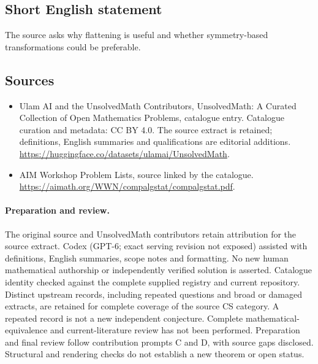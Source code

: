 \documentclass[11pt]{article}
\begin{document}
\subsection{Short English statement}
The source asks why flattening is useful and whether symmetry-based transformations could be preferable.
\subsection{Sources}
\begin{itemize}
\item[\hypertarget{source:statement:1}{S1}] Ulam AI and the UnsolvedMath Contributors, UnsolvedMath: A Curated Collection of Open Mathematics Problems, catalogue entry. Catalogue curation and metadata: CC BY 4.0. The source extract is retained; definitions, English summaries and qualifications are editorial additions.
\url{https://huggingface.co/datasets/ulamai/UnsolvedMath}.
\item[\hypertarget{source:statement:2}{S2}] AIM Workshop Problem Lists, source linked by the catalogue.
\url{https://aimath.org/WWN/compalgstat/compalgstat.pdf}.
\end{itemize}
\paragraph{Preparation and review.}
The original source and UnsolvedMath contributors retain attribution for the source extract. Codex (GPT-6; exact serving revision not exposed) assisted with definitions, English summaries, scope notes and formatting. No new human mathematical authorship or independently verified solution is asserted. Catalogue identity checked against the complete supplied registry and current repository. Distinct upstream records, including repeated questions and broad or damaged extracts, are retained for complete coverage of the source CS category. A repeated record is not a new independent conjecture. Complete mathematical-equivalence and current-literature review has not been performed. Preparation and final review follow contribution prompts C and D, with source gaps disclosed. Structural and rendering checks do not establish a new theorem or open status.
\label{end:statement}
\end{document}
